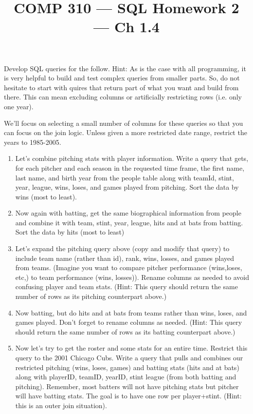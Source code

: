\documentclass[nobib]{tufte-handout}
\title{COMP 310 --- SQL Homework 2 --- Ch 1.4 }
\author{  }
\date{ }
\begin{document}
\maketitle

Develop SQL queries for the follow. Hint: As is the case with all programming, it is very helpful to build and test complex queries from smaller parts. So, do not hesitate to start with quires that return part of what you want and build from there. This can mean excluding columns or artificially restricting rows (i.e. only one year).

We'll focus on selecting a small number of columns for these queries so that you can focus on the join logic. Unless given a more restricted date range, restrict the years to 1985-2005. 

\begin{enumerate}
    \item Let's combine pitching stats with player information. Write a query that gets, for each pitcher and each season in the requested time frame, the first name, last name, and birth year from the people table along with teamId, stint, year, league, wins,  loses, and games played from pitching.  Sort the data by wins (most to least).
    \item Now again with batting, get the same biographical information from people and combine it with team, stint, year, league, hits and at bats from batting. Sort the data by hits (most to least)
    \item Let's expand the pitching query above (copy and modify that query) to include team name (rather than id), rank, wins, losses, and games played from teams. (Imagine you want to compare pitcher performance (wins,loses, etc,) to team performance (wins, losses)). Rename columns as needed to avoid confusing player and team stats. (Hint: This query should return the same number of rows as its pitching counterpart above.)
    \item Now batting, but do hits and at bats from teams rather than wins, loses, and games played. Don't forget to rename columns as needed. (Hint: This query should return the same number of rows as its batting counterpart above.)
    \item Now let's try to get the roster and some stats for an entire time. Restrict this query to the 2001 Chicago Cubs. Write a query that pulls and combines our restricted pitching (wins, loses, games) and batting stats (hits and at bats) along with playerID, teamID, yearID, stint league (from both batting and pitching). Remember, most batters will not have pitching stats but pitcher will have batting stats. The goal is to have one row per player+stint.  (Hint: this is an outer join situation).

\end{enumerate}
\end{document}
